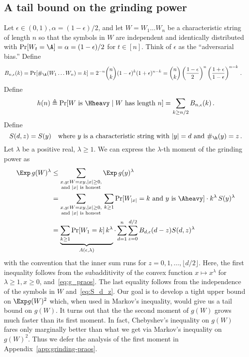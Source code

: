 \subsection{A tail bound on the grinding power}
Let $\epsilon \in (0, 1), \alpha = (1 - \epsilon)/2$, and 
let $W = W_1 \ldots W_n$ be a characteristic string of length $n$ so that 
the symbols in $W$ are independent and identically distributed 
with $\Pr[W_t = \A] = \alpha = (1 - \epsilon)/2$ for $t \in [n]$.
Think of $\epsilon$ as the ``adversarial bias.'' 
Define 
\begin{align}\label{eq:suffix-prob-binomial}
    B_{n, \epsilon}(k) 
    &= \Pr[ \#_\A(W_1 \ldots W_n) = k ]  
    = 2^{-n}\binom{n}{k} (1-\epsilon)^k (1 + \epsilon)^{n-k} 
    =  \binom{n}{k} 
        \left(\frac{1-\epsilon}{2}\right)^n 
        \left(\frac{1 + \epsilon}{1-\epsilon} \right)^{n-k} 
        \,.
\end{align}
Define
\begin{equation}\label{eq:prob-Hheavy}
  h(n) 
  \triangleq \Pr[\text{$W$ is $\Hheavy \mid W$ has length $n$}] 
  = \sum_{k \geq n/2} B_{n, \epsilon}(k)
  \,.
\end{equation}
Define
\begin{equation}\label{eq:S_d_z}
  S(d, z) = S(y) \quad\text{where $y$ is a characteristic string with $|y| = d$ and $\#_\h(y) = z$}
  \,.  
\end{equation}
Let $\lambda$ be a positive real, $\lambda \geq 1$. 
We can express the $\lambda$-th moment of the grinding power as
\begin{align}\label{eq:grinding-power-moment-praos}
    \Exp\, g(W)^\lambda 
    &\leq \sum_{\substack{x,y : W = xy, |x| \geq 0, \\ \text{and $|x|$ is honest} }} 
      \Exp\, g(y)^\lambda \nonumber \\
    &= \sum_{\substack{x,y : W = xy, |x| \geq 0, \\ \text{and $|x|$ is honest} }}\, \sum_{k \geq 1} 
      \Pr[\text{$W_{|x|} = k$ and $y$ is $\Aheavy$}] \cdot k^\lambda\, S(y)^\lambda \nonumber \\
    &=  %
        \underbrace{\sum_{k\geq 1} \Pr[W_1 = k]\, k^\lambda}_{A(\epsilon, \lambda)} 
        \cdot 
        \sum_{d=1}^n \sum_{z = 0}^{ d/2 } B_{d, \epsilon}(d - z) S(d,z)^\lambda
\end{align}
with the convention that 
the inner sum runs for $z = 0, 1, \ldots, \lfloor d/2 \rfloor$. 
Here, the first inequality follows from 
the subadditivity of the convex function 
$x \mapsto x^\lambda$ for $\lambda \geq 1, x \geq 0$,  
and~\eqref{eq:g_praos}. 
The last equality follows from the independence of the symbols in $W$ 
and~\eqref{eq:S_d_z}.
Our goal is to develop a tight upper bound on $\Exp g(W)^2$ 
which, when used in Markov's inequality, 
would give us a tail bound on $g(W)$. 
{\color{blue}It turns out that the the second moment of $g(W)$ grows 
much faster than its first moment. In fact, 
Chebyshev's inequality on $g(W)$ fares only marginally better 
than what we get via Markov's inequality on $g(W)^2$. 
Thus we defer the analysis of the first moment in Appendix~\ref{app:grinding-praos}.}


